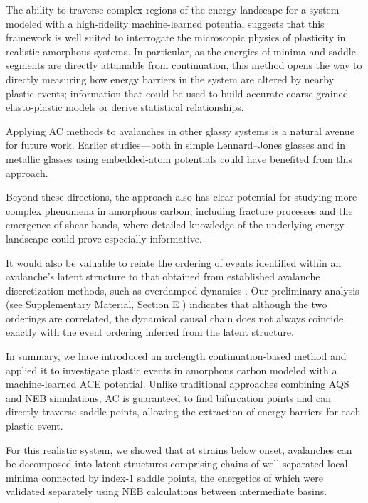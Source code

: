 \documentclass[aps,prl,reprint,superscriptaddress]{revtex4-2}
\begin{document}
The ability to traverse complex regions of the energy landscape for a system modeled with a high-fidelity machine-learned potential suggests that this framework is well suited to interrogate the microscopic physics of plasticity in realistic amorphous systems. In particular, as the energies of minima and saddle segments are directly attainable from continuation, this method opens the way to directly measuring how energy barriers in the system are altered by nearby plastic events; information that could be used to build accurate coarse-grained elasto-plastic models or derive statistical relationships.

Applying AC methods to avalanches in other glassy systems is a natural avenue for future work. Earlier studies—both in simple Lennard–Jones glasses \cite{Salerno_2012,Moriel_2024,Oyama_2024,Dattani_2022} and in metallic glasses using embedded-atom potentials \cite{Duan_2023} could have benefited from this approach.

Beyond these directions, the approach also has clear potential for studying more complex phenomena in amorphous carbon, including fracture processes and the emergence of shear bands, where detailed knowledge of the underlying energy landscape could prove especially informative.

It would also be valuable to relate the ordering of events identified within an avalanche’s latent structure to that obtained from established avalanche discretization methods, such as overdamped dynamics \cite{Salman_2011,Baggio_2023}. Our preliminary analysis (see Supplementary Material, Section E \cite{SupplementalE}) indicates that although the two orderings are correlated, the dynamical causal chain does not always coincide exactly with the event ordering inferred from the latent structure.

In summary, we have introduced an arclength continuation-based method and applied it to investigate plastic events in amorphous carbon modeled with a machine-learned ACE potential. Unlike traditional approaches combining AQS and NEB simulations, AC is guaranteed to find bifurcation points and can directly traverse saddle points, allowing the extraction of energy barriers for each plastic event.

For this realistic system, we showed that at strains below onset, avalanches can be decomposed into latent structures comprising chains of well-separated local minima connected by index-1 saddle points, the energetics of which were validated separately using NEB calculations between intermediate basins.
\end{document}
